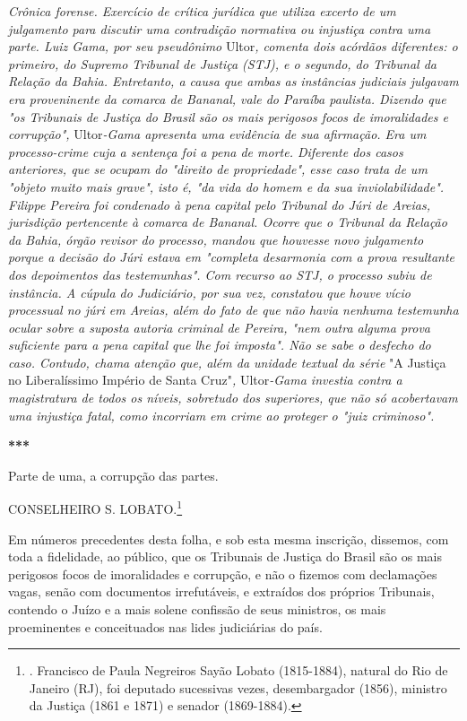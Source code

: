 \emph{Crônica forense. Exercício de crítica jurídica que utiliza excerto
de um julgamento para discutir uma contradição normativa ou injustiça
contra uma parte. Luiz Gama, por seu pseudônimo} Ultor\emph{, comenta
dois acórdãos diferentes: o primeiro, do Supremo Tribunal de Justiça
(STJ), e o segundo, do Tribunal da Relação da Bahia. Entretanto, a causa
que ambas as instâncias judiciais julgavam era proveninente da comarca
de Bananal, vale do Paraíba paulista. Dizendo que "os Tribunais de
Justiça do Brasil são os mais perigosos focos de imoralidades e
corrupção",} Ultor\emph{-Gama apresenta uma evidência de sua afirmação.
Era um processo-crime cuja a sentença foi a pena de morte. Diferente dos
casos anteriores, que se ocupam do "direito de propriedade", esse caso
trata de um "objeto muito mais grave", isto é, "da vida do homem e da
sua inviolabilidade". Filippe Pereira foi condenado à pena capital pelo
Tribunal do Júri de Areias, jurisdição pertencente à comarca de Bananal.
Ocorre que o Tribunal da Relação da Bahia, órgão revisor do processo,
mandou que houvesse novo julgamento porque a decisão do Júri estava em
"completa desarmonia com a prova resultante dos depoimentos das
testemunhas". Com recurso ao STJ, o processo subiu de instância. A
cúpula do Judiciário, por sua vez, constatou que houve vício processual
no júri em Areias, além do fato de que não havia nenhuma testemunha
ocular sobre a suposta autoria criminal de Pereira, "nem outra alguma
prova suficiente para a pena capital que lhe foi imposta". Não se sabe o
desfecho do caso. Contudo, chama atenção que, além da unidade textual da
série} "A Justiça no Liberalíssimo Império de Santa Cruz"\emph{,}
Ultor\emph{-Gama investia contra a magistratura de todos os níveis,
sobretudo dos superiores, que não só acobertavam uma injustiça fatal,
como incorriam em crime ao proteger o "juiz criminoso".}

\textbf{***}

Parte de uma, a corrupção das partes.

CONSELHEIRO S. LOBATO.\footnote{. Francisco de Paula Negreiros Sayão
  Lobato (1815-1884), natural do Rio de Janeiro (RJ), foi deputado
  sucessivas vezes, desembargador (1856), ministro da Justiça (1861 e
  1871) e senador (1869-1884).}

Em números precedentes desta folha, e sob esta mesma inscrição,
dissemos, com toda a fidelidade, ao público, que os Tribunais de Justiça
do Brasil são os mais perigosos focos de imoralidades e corrupção, e não
o fizemos com declamações vagas, senão com documentos irrefutáveis, e
extraídos dos próprios Tribunais, contendo o Juízo e a mais solene
confissão de seus ministros, os mais proeminentes e conceituados nas
lides judiciárias do país.

